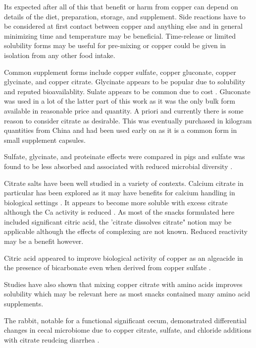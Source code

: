 Its expected after all of this that benefit or harm from
copper can depend on details of the diet, preparation, storage, and
supplement. Side reactions have to be considered at first contact
between copper and anything else and in general minimizing time
and temperature may be beneficial.  Time-release or limited
solubility forms may be useful for pre-mixing or copper could be
given in isolation from any other food intake.

Common supplement forms include copper sulfate, copper gluconate,
copper glycinate, and copper citrate.  Glycinate appears to be popular
due to solubility and reputed bioavailablity. Sulate appears to be
common due to cost \cite{Wu_Tan_Shi_vitro_bioaccessibility_2024}. 
Gluconate was used in a lot of the latter
part of this work as it was the only bulk form available in 
reasonable price and quantity. A priori and currently there is some
reason to consider citrate as desirable. This was eventually
purchased in kilogram quantities from China and had been used
early on as it is a common form in small supplement capsules.

Sulfate, glycinate, and proteinate effects were compared
in pigs and sulfate was found to be less absorbed and associated
with reduced microbial diversity \cite{PMC8718720}. 


Citrate salts have been well studied in a variety of contexts.
Calcium citrate in particular  has been explored as
it may have benefits for calcium handling in 
biological settings 
\cite{Liu_Skibsted_Citrate_calcium_transport_2023}.
It appears to become more soluble
with excess citrate although the Ca activity is reduced
\cite{Vavrusova_Skibsted_Aqueous_solubility_calcium_2016}.
As most of the snacks formulated here included significant
citric acid, the 'citrate dissolves citrate" notion may be
applicable although the effects of complexing are not 
known. Reduced reactivity may be a benefit however.

Citric acid appeared to improve biological activity
of copper as an algeacide in the presence of bicarbonate
even when derived from copper sulfate
\cite{Swader_Chan_Citric_acid_enhancement_1975}.

Studies have also shown that mixing copper citrate
with amino acids improves solubility
\cite{Sobel_Haigney_Kim_complexation_aqueous_}
which may be relevant here as most snacks contained
many amino acid supplements. 

The rabbit, notable for a functional significant cecum,
demonstrated differential changes in cecal microbiome
due to copper citrate, sulfate, and chloride additions
with citrate reudcing diarrhea \cite{10.3389/fvets.2023.1179374}.




